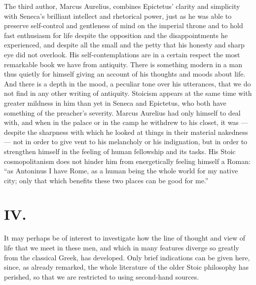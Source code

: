 \documentclass[12pt,a4paper,openany]{book}
\newcommand{\opage}[1]{\marginnote{\footnotesize\textit{[#1]}}}
\begin{document}
The third author, Marcus Aurelius, combines Epictetus'
clarity and simplicity with Seneca's brilliant intellect and
rhetorical power, just as he was able to preserve
self-control and gentleness of mind on the imperial throne and to
hold fast enthusiasm for life despite the opposition and the
disappointments he experienced, and despite all the small and the petty
that his honesty and sharp eye did not overlook. His
self-contemplations are in a certain respect the most remarkable book we
have from antiquity. There is something modern in a man
thus quietly for himself giving an account of his thoughts and
moods about life. And there is a depth in the mood,
a peculiar tone over his utterances, that we do not find
in any other writing of antiquity. Stoicism appears at the same time
with greater mildness in him than yet in Seneca and Epictetus,
who both have something of the preacher's severity. Marcus
\opage{167}Aurelius had only himself to deal with, and when in the
palace or in the camp he withdrew to his closet,
it was --- despite the sharpness with which he looked at things
in their material nakedness --- not in order to give vent to his melancholy
or his indignation, but in order to strengthen himself in the feeling of
human fellowship and its tasks. His Stoic
cosmopolitanism does not hinder him from energetically feeling himself a
Roman: ``as Antoninus I have Rome, as a human being the whole
world for my native city; only that which benefits these two places
can be good for me.''

\section*{IV.}

It may perhaps be of interest to investigate
how the line of thought and view of life that we meet in these
men, and which in many features diverge so greatly from the
classical Greek, has developed. Only brief indications
can be given here, since, as already remarked, the whole literature of the older
Stoic philosophy has perished, so that we are
restricted to using second-hand sources.
\end{document}
